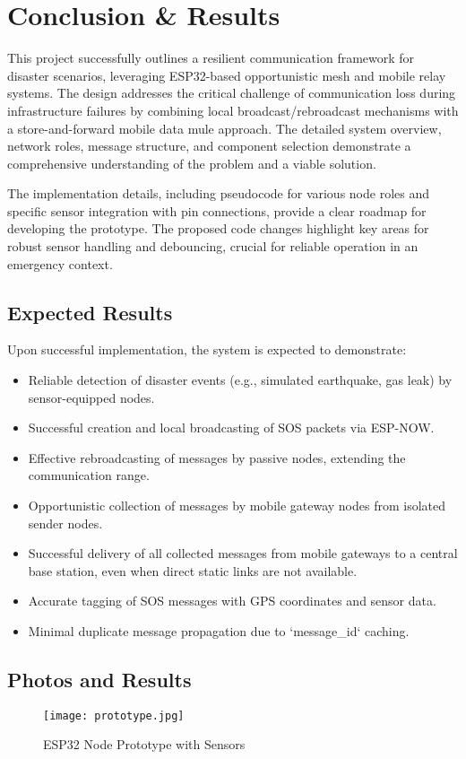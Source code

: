 \documentclass[12pt, a4paper]{article}
\begin{document}
\section{Conclusion \& Results} 
This project successfully outlines a resilient communication framework for disaster scenarios, leveraging ESP32-based opportunistic mesh and mobile relay systems. The design addresses the critical challenge of communication loss during infrastructure failures by combining local broadcast/rebroadcast mechanisms with a store-and-forward mobile data mule approach. The detailed system overview, network roles, message structure, and component selection demonstrate a comprehensive understanding of the problem and a viable solution.

The implementation details, including pseudocode for various node roles and specific sensor integration with pin connections, provide a clear roadmap for developing the prototype. The proposed code changes highlight key areas for robust sensor handling and debouncing, crucial for reliable operation in an emergency context.

\subsection{Expected Results}
Upon successful implementation, the system is expected to demonstrate:
\begin{itemize}
    \item Reliable detection of disaster events (e.g., simulated earthquake, gas leak) by sensor-equipped nodes.
    \item Successful creation and local broadcasting of SOS packets via ESP-NOW.
    \item Effective rebroadcasting of messages by passive nodes, extending the communication range.
    \item Opportunistic collection of messages by mobile gateway nodes from isolated sender nodes.
    \item Successful delivery of all collected messages from mobile gateways to a central base station, even when direct static links are not available.
    \item Accurate tagging of SOS messages with GPS coordinates and sensor data.
    \item Minimal duplicate message propagation due to `message_id` caching.
\end{itemize}

\subsection{Photos and Results}
\begin{figure}[H]
    \centering
    \texttt{[image: prototype.jpg]} %
    \caption{ESP32 Node Prototype with Sensors}
    \label{fig:prototype_1}
\end{figure}
\end{document}
